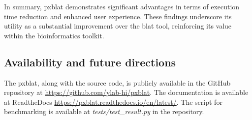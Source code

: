 \documentclass[10pt,letterpaper]{article}
\begin{document}
In summary, \gls{pxblat} demonstrates significant advantages in terms of execution time reduction and enhanced user experience.
These findings underscore its utility as a substantial improvement over the \gls{blat} tool, reinforcing its value within the bioinformatics toolkit.

\subsection*{Availability and future directions}

The \gls{pxblat}, along with the source code, is publicly available in the GitHub repository at \url{https://github.com/ylab-hi/pxblat}.
The documentation is available at ReadtheDocs \url{https://pxblat.readthedocs.io/en/latest/}.
The script for benchmarking is available at \emph{tests/test\_result.py} in the repository.
\end{document}
